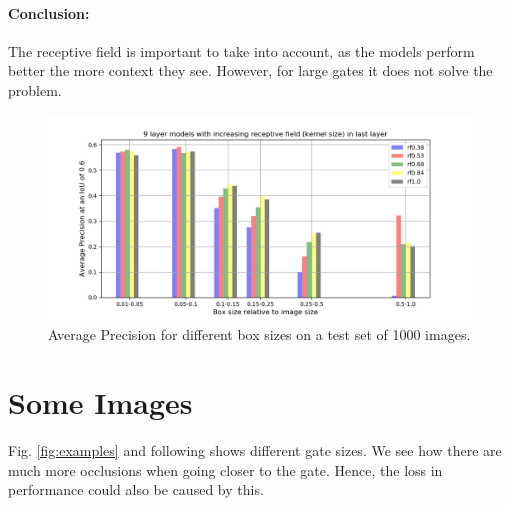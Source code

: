 \documentclass{article}
\begin{document}
\paragraph{Conclusion:} The receptive field is important to take into account, as the models perform better the more context they see. However, for large gates it does not solve the problem. 

\begin{figure}[htbp]
	\includegraphics[width=\linewidth]{box_size_rf_06}
	\caption{Average Precision for different box sizes on a test set of 1000 images.}
	\label{fig:box_size}
\end{figure}

\section{Some Images}

Fig. \ref{fig:examples} and following shows different gate sizes. We see how there are much more occlusions when going closer to the gate. Hence, the loss in performance could also be caused by this.
\end{document}
